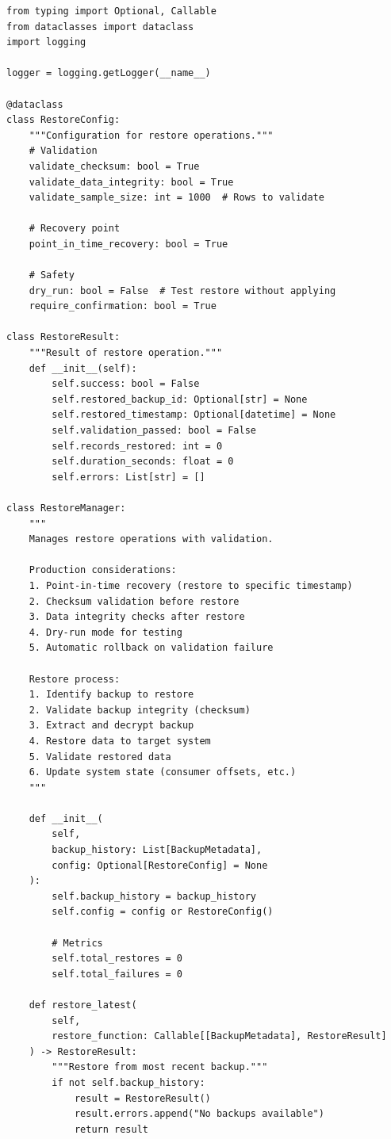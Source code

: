 \begin{lstlisting}[style=python, caption={Restore Manager with Validation}]
from typing import Optional, Callable
from dataclasses import dataclass
import logging

logger = logging.getLogger(__name__)

@dataclass
class RestoreConfig:
    """Configuration for restore operations."""
    # Validation
    validate_checksum: bool = True
    validate_data_integrity: bool = True
    validate_sample_size: int = 1000  # Rows to validate

    # Recovery point
    point_in_time_recovery: bool = True

    # Safety
    dry_run: bool = False  # Test restore without applying
    require_confirmation: bool = True

class RestoreResult:
    """Result of restore operation."""
    def __init__(self):
        self.success: bool = False
        self.restored_backup_id: Optional[str] = None
        self.restored_timestamp: Optional[datetime] = None
        self.validation_passed: bool = False
        self.records_restored: int = 0
        self.duration_seconds: float = 0
        self.errors: List[str] = []

class RestoreManager:
    """
    Manages restore operations with validation.

    Production considerations:
    1. Point-in-time recovery (restore to specific timestamp)
    2. Checksum validation before restore
    3. Data integrity checks after restore
    4. Dry-run mode for testing
    5. Automatic rollback on validation failure

    Restore process:
    1. Identify backup to restore
    2. Validate backup integrity (checksum)
    3. Extract and decrypt backup
    4. Restore data to target system
    5. Validate restored data
    6. Update system state (consumer offsets, etc.)
    """

    def __init__(
        self,
        backup_history: List[BackupMetadata],
        config: Optional[RestoreConfig] = None
    ):
        self.backup_history = backup_history
        self.config = config or RestoreConfig()

        # Metrics
        self.total_restores = 0
        self.total_failures = 0

    def restore_latest(
        self,
        restore_function: Callable[[BackupMetadata], RestoreResult]
    ) -> RestoreResult:
        """Restore from most recent backup."""
        if not self.backup_history:
            result = RestoreResult()
            result.errors.append("No backups available")
            return result


\end{lstlisting}
